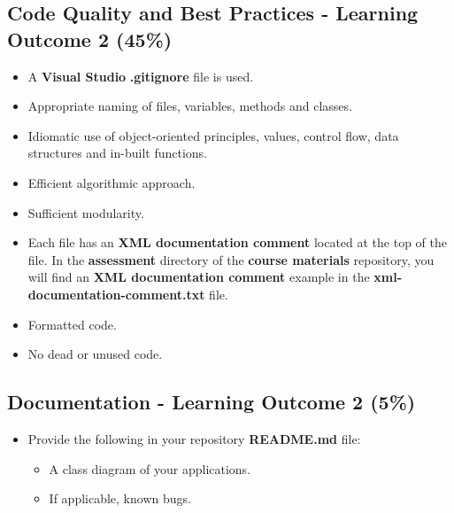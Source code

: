\documentclass{article}
\begin{document}
\subsection*{Code Quality and Best Practices - Learning Outcome 2 (45\%)}
\begin{itemize}
    \item A \textbf{Visual Studio} \textbf{.gitignore} file is used. 
    \item Appropriate naming of files, variables, methods and classes.
    \item Idiomatic use of object-oriented principles, values, control flow, data structures and in-built functions.
    \item Efficient algorithmic approach.
    \item Sufficient modularity.
    \item Each file has an \textbf{XML documentation comment} located at the top of the file. In the \textbf{assessment} directory of the \textbf{course materials} repository, you will find an \textbf{XML documentation comment} example in the \textbf{xml-documentation-comment.txt} file.
    \item Formatted code.
    \item No dead or unused code.
\end{itemize}

\subsection*{Documentation - Learning Outcome 2 (5\%)}
\begin{itemize}
    \item Provide the following in your repository \textbf{README.md} file:
    \begin{itemize}
        \item A class diagram of your applications.
        \item If applicable, known bugs.
    \end{itemize}
\end{itemize}
\end{document}
